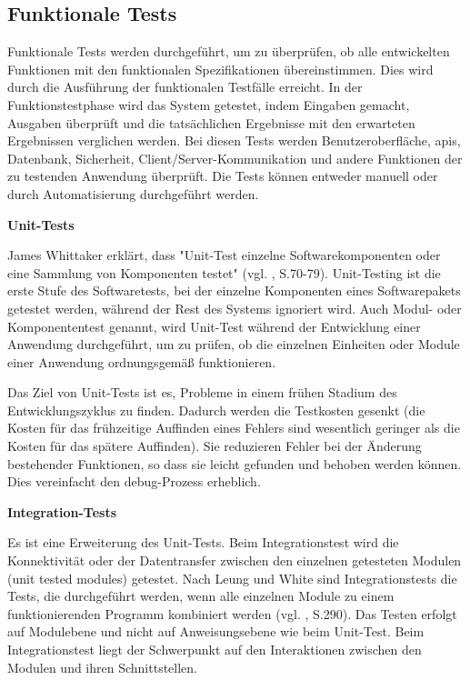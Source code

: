 \subsection{Funktionale Tests}

Funktionale Tests werden durchgeführt, um zu überprüfen,
ob alle entwickelten Funktionen mit den funktionalen
Spezifikationen übereinstimmen. Dies wird durch die
Ausführung der funktionalen Testfälle erreicht. In der
Funktionstestphase wird das System getestet, indem
Eingaben gemacht, Ausgaben überprüft und die
tatsächlichen Ergebnisse mit den erwarteten
Ergebnissen verglichen werden. Bei diesen Tests werden
Benutzeroberfläche, \acs{api}s, Datenbank, Sicherheit,
Client/Server-Kommunikation und andere Funktionen der zu
testenden Anwendung überprüft. Die Tests können entweder
manuell oder durch Automatisierung durchgeführt werden.

\textbf{Unit-Tests}

James Whittaker erklärt, dass "Unit-Test einzelne Softwarekomponenten oder
eine Sammlung von Komponenten testet" (vgl. \cite{Whittaker2000}, S.70-79).
Unit-Testing ist die erste Stufe des Softwaretests, bei der einzelne
Komponenten eines Softwarepakets getestet werden, während der Rest des
Systems ignoriert wird. Auch Modul- oder Komponententest genannt,
wird Unit-Test während der Entwicklung einer Anwendung durchgeführt,
um zu prüfen, ob die einzelnen Einheiten oder Module einer Anwendung
ordnungsgemäß funktionieren.


Das Ziel von Unit-Tests ist es, Probleme in einem frühen Stadium des
Entwicklungszyklus zu finden. Dadurch werden die Testkosten gesenkt
(die Kosten für das frühzeitige Auffinden eines Fehlers sind wesentlich
geringer als die Kosten für das spätere Auffinden). Sie reduzieren Fehler
bei der Änderung bestehender Funktionen, so dass sie leicht gefunden und
behoben werden können. Dies vereinfacht den \gls{debug}-Prozess erheblich.


\textbf{Integration-Tests}

Es ist eine Erweiterung des Unit-Tests. Beim Integrationstest wird die
Konnektivität oder der Datentransfer zwischen den einzelnen getesteten
Modulen (unit tested modules) getestet. Nach Leung und White sind
Integrationstests die Tests, die durchgeführt werden, wenn alle
einzelnen Module zu einem funktionierenden Programm kombiniert
werden (vgl. \cite{131377}, S.290). Das Testen erfolgt auf Modulebene und nicht
auf Anweisungsebene wie beim Unit-Test. Beim Integrationstest liegt der
Schwerpunkt auf den Interaktionen zwischen den Modulen und ihren
Schnittstellen.


